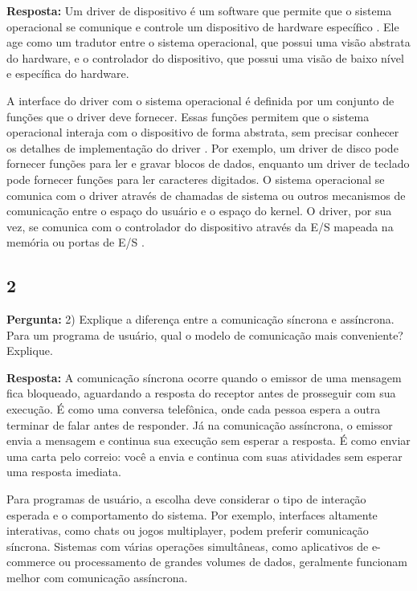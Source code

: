 \documentclass{article}
\begin{document}
\textbf{Resposta:} Um driver de dispositivo é um software que permite que o sistema operacional se comunique e controle um dispositivo de hardware específico \parencite[p. 533]{tanenbaum2021}. Ele age como um tradutor entre o sistema operacional, que possui uma visão abstrata do hardware, e o controlador do dispositivo, que possui uma visão de baixo nível e específica do hardware.

A interface do driver com o sistema operacional é definida por um conjunto de funções que o driver deve fornecer. Essas funções permitem que o sistema operacional interaja com o dispositivo de forma abstrata, sem precisar conhecer os detalhes de implementação do driver \parencite[p. 250]{tanenbaum2021}. Por exemplo, um driver de disco pode fornecer funções para ler e gravar blocos de dados, enquanto um driver de teclado pode fornecer funções para ler caracteres digitados. O sistema operacional se comunica com o driver através de chamadas de sistema ou outros mecanismos de comunicação entre o espaço do usuário e o espaço do kernel. O driver, por sua vez, se comunica com o controlador do dispositivo através da E/S mapeada na memória ou portas de E/S \parencite[p. 236]{tanenbaum2021}.

\subsection{2}

\textbf{Pergunta:} 2) Explique a diferença entre a comunicação síncrona e assíncrona. Para um programa de usuário, qual o modelo de comunicação mais conveniente? Explique. \newline

\textbf{Resposta:} A comunicação síncrona ocorre quando o emissor de uma mensagem fica bloqueado, aguardando a resposta do receptor antes de prosseguir com sua execução. É como uma conversa telefônica, onde cada pessoa espera a outra terminar de falar antes de responder. Já na comunicação assíncrona, o emissor envia a mensagem e continua sua execução sem esperar a resposta. É como enviar uma carta pelo correio: você a envia e continua com suas atividades sem esperar uma resposta imediata.

Para programas de usuário, a escolha deve considerar o tipo de interação esperada e o comportamento do sistema. Por exemplo, interfaces altamente interativas, como chats ou jogos multiplayer, podem preferir comunicação síncrona. Sistemas com várias operações simultâneas, como aplicativos de e-commerce ou processamento de grandes volumes de dados, geralmente funcionam melhor com comunicação assíncrona.
\end{document}
